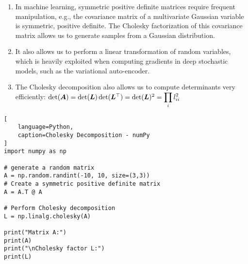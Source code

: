\begin{enumerate}
    \item In machine learning, symmetric positive definite matrices require frequent manipulation, e.g., the covariance matrix of a multivariate Gaussian variable is symmetric, positive definite.
    The Cholesky factorization of this covariance matrix allows us to generate samples from a Gaussian distribution.
    \hfill \cite{mfml/book/mml/Deisenroth-Faisal-Ong}

    \item  It also allows us to perform a linear transformation of random variables, which is heavily exploited when computing gradients in deep stochastic models, such as the variational auto-encoder.
    \hfill \cite{mfml/book/mml/Deisenroth-Faisal-Ong}

    \item The Cholesky decomposition also allows us to compute determinants very efficiently:
    $
        \det(\bm{A})
        = \det(\bm{L}) \det(\bm{L}^\top)
        = \det(\bm{L})^2
        = \displaystyle\prod_i l_{ii}^2
    $
    \hfill \cite{mfml/book/mml/Deisenroth-Faisal-Ong}
\end{enumerate}


\begin{lstlisting}[
    language=Python,
    caption=Cholesky Decomposition - numPy
]
import numpy as np

# generate a random matrix
A = np.random.randint(-10, 10, size=(3,3))
# Create a symmetric positive definite matrix
A = A.T @ A

# Perform Cholesky decomposition
L = np.linalg.cholesky(A)

print("Matrix A:")
print(A)
print("\nCholesky factor L:")
print(L)
\end{lstlisting}







